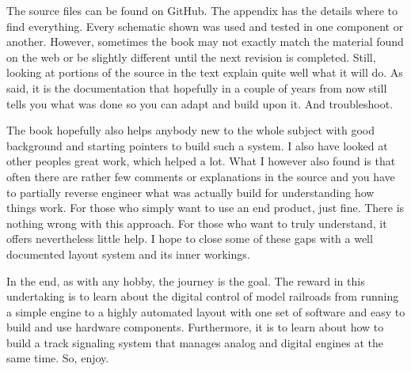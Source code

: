 The source files  can be found on GitHub. The appendix has the details where to find everything. Every schematic shown was used and tested in one component or another. However, sometimes the book may not exactly match the material found on the web or be slightly different until the next revision is completed. Still, looking at portions of the source in the text explain quite well what it will do. As said, it is the documentation that hopefully in a couple of years from now still tells you what was done so you can adapt and build upon it. And troubleshoot.

The book hopefully also helps anybody new to the whole subject with good background and starting pointers to build such a system. I also have looked at other peoples great work, which helped a lot. What I however also found is that often there are rather few comments or explanations in the source and you have to partially reverse engineer what was actually build for understanding how things work. For those who simply want to use an end product, just fine. There is nothing wrong with this approach. For those who want to truly understand, it offers nevertheless little help. I hope to close some of these gaps with a well documented layout system and its inner workings.

In the end, as with any hobby, the journey is the goal. The reward in this undertaking is to learn about the digital control of model railroads from running a simple engine to a highly automated layout with one set of software and easy to build and use hardware components. Furthermore, it is to learn about how to build a track signaling system that manages analog and digital engines at the same time. So, enjoy.



